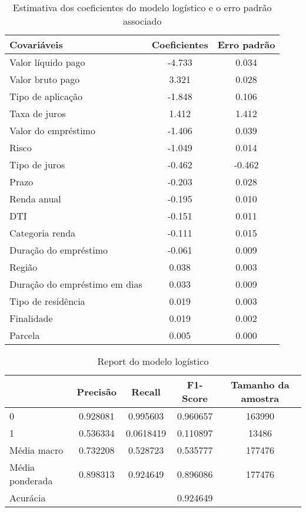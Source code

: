 \begin{table}[H]
\centering
\begin{tabular}{lcc}
  \toprule
    \textbf{Covariáveis} & \textbf{Coeficientes} &  \textbf{Erro padrão} \\
  \midrule
        Valor líquido pago & -4.733 &  0.034 \\
        Valor bruto pago &  3.321 &  0.028 \\
        Tipo de aplicação & -1.848 &  0.106 \\
        Taxa de juros &  1.412 &  1.412 \\
        Valor do empréstimo & -1.406 &  0.039 \\
        Risco & -1.049 &  0.014 \\
        Tipo de juros & -0.462 &  -0.462  \\
        Prazo & -0.203 &  0.028 \\
        Renda anual & -0.195 &  0.010 \\
        DTI & -0.151 &  0.011 \\
        Categoria renda & -0.111 &  0.015 \\
        Duração do empréstimo & -0.061 &  0.009 \\
        Região &  0.038 &  0.003\\
        Duração do empréstimo em dias &  0.033 &  0.009 \\
        Tipo de residência &  0.019 &  0.003 \\
        Finalidade &  0.019 &  0.002  \\
        Parcela &  0.005 &  0.000  \\
  \bottomrule
\end{tabular}
\caption{Estimativa dos coeficientes do modelo logístico e o erro padrão associado}
\label{tab:result_model_logist}
\end{table}

\begin{table}[H]
\centering
\begin{tabular}{lcccc}
  \hline
                &    \textbf{Precisão} & \textbf{Recall}    &   \textbf{F1-Score} &  \textbf{Tamanho da amostra} \\
  \hline
   0            &    0.928081 & 0.995603  &   0.960657 & 163990        \\
   1            &    0.536334 & 0.0618419 &   0.110897 & 13486        \\
   Média macro    &    0.732208 & 0.528723  &   0.535777 & 177476        \\
   Média ponderada &    0.898313 & 0.924649  &   0.896086 & 177476        \\
   \hline
   Acurácia     &             &           &   0.924649 &  \\

  \hline
\end{tabular}
\label{tab:report_logist_model}
\caption{Report do modelo logístico}
\end{table}

